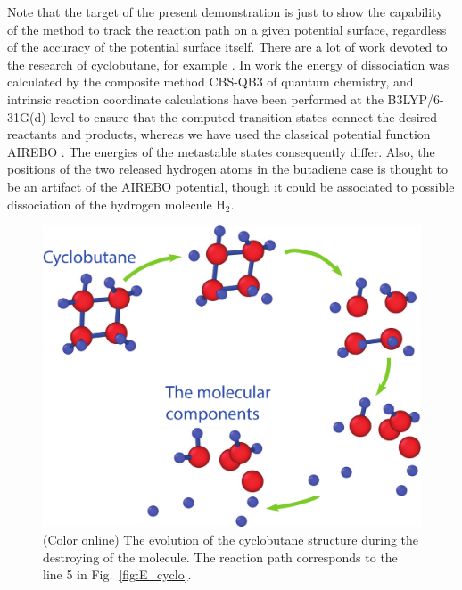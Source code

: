\documentclass[preprint,12pt]{elsarticle}
\begin{document}
Note that the target of the present demonstration is just to show the capability of the method to track the reaction path on a given potential surface, regardless of the accuracy of the potential surface itself. There are a lot of work devoted to the research of cyclobutane, for example \cite{cyclo_laser_2,cyclobutane,cyclo_laser,cyclo_tethra}. In work \cite{cyclo_laser_2} the energy of dissociation was calculated by the composite method CBS-QB3 of quantum chemistry, and intrinsic reaction coordinate calculations have been performed at the B3LYP/6-31G(d) level to ensure that the computed transition states connect the desired reactants and products, whereas we have used the classical potential function AIREBO \cite{airbo}. The energies of the metastable states consequently differ. Also, the positions of the two released hydrogen atoms in the butadiene case is thought to be an artifact of the AIREBO potential, though it could be associated to possible dissociation of the hydrogen molecule H$_2$. %


\begin{figure}[!t]
 \begin{center}
 \includegraphics[scale=0.25]{Cyclo_destroying.pdf}
  \caption{(Color online) The evolution of the cyclobutane structure during the destroying of the molecule. 
  The reaction path corresponds to the line 5 in Fig.~\ref{fig:E_cyclo}.}
  \label{fig:paths_cyclo_destr}
 \end{center}
\end{figure}
\end{document}
